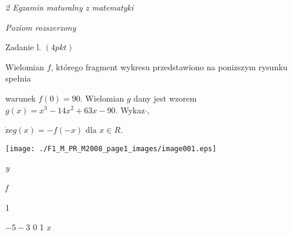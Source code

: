 \documentclass[a4paper,12pt]{article}
\begin{document}
{\it 2 Egzamin maturalny z matematyki}

{\it Poziom rozszerzony}

Zadanie l. $(4pkt)$

Wielomian $f$, którego fragment wykresu przedstawiono na ponizszym rysunku spełnia

warunek $f(0)=90$. Wielomian $g$ dany jest wzorem $g(x)=x^{3}-14x^{2}+63x-90$. Wykaz$\cdot,$

$\dot{\mathrm{z}}\mathrm{e}g(x)=-f(-x)$ dla $x\in R.$
\begin{center}
\texttt{[image: ./F1\_M\_PR\_M2008\_page1\_images/image001.eps]}
\end{center}
{\it y}

{\it f}

1

$-5  -3$  0 1  {\it x}
\end{document}
